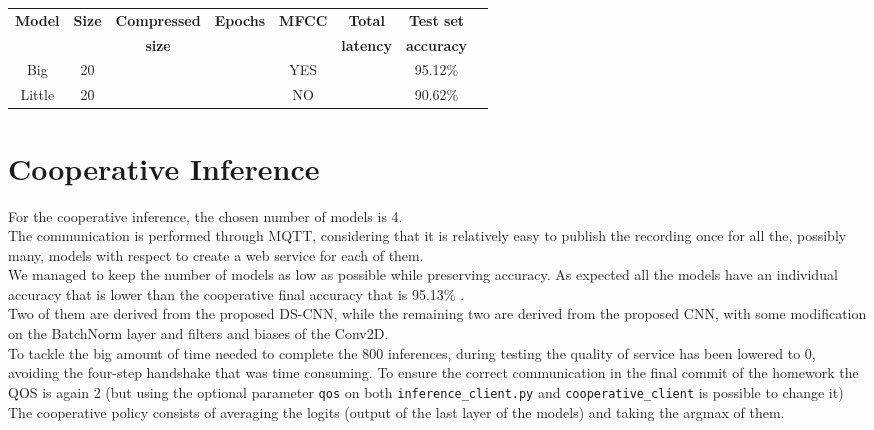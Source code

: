 \documentclass{article}
\begin{document}
\begin{center}
\begin{tabular}{ |c|c|c|c|c|c|c|c| } 
\hline
\vspace{-0.09cm}

\textbf{Model} &\textbf{Size} &\textbf{Compressed} &\textbf{Epochs}&\textbf{MFCC} &\textbf{Total}&\textbf{Test set}\\
\textbf{} &\textbf{} &\textbf{size} &\textbf{}&\textbf{}&\textbf{latency} &\textbf{accuracy}\\
\hline
Big   & 20 & & & YES & & 95.12\%\\
Little& 20 & & & NO  & & 90.62\%\\
\hline

\end{tabular}

\end{center}


\section{Cooperative Inference}
For the cooperative inference, the chosen number of models is 4.\\
The communication is performed through MQTT, considering that it is relatively easy to publish the recording once for all the, possibly many, models with respect to create a web service for each of them.\\
We managed to keep the number of models as low as possible while preserving accuracy.
As expected all the models have an individual accuracy that is lower than the cooperative final accuracy that is 95.13\% .\\
Two of them are derived from the proposed DS-CNN, while the remaining two are derived from the proposed CNN, with some modification on the BatchNorm layer and filters and biases of the Conv2D.\\
To tackle the big amount of time needed to complete the 800 inferences, during testing the quality of service has been lowered to 0,
avoiding the four-step handshake that was time consuming. To ensure the correct communication in the final commit of the homework the
QOS is again 2 (but using the optional parameter \verb#qos# on both \verb#inference_client.py# and \verb#cooperative_client# is possible to change it)\\
The cooperative policy consists of averaging the logits (output of the last layer of the models) and taking the argmax of them.
\end{document}
